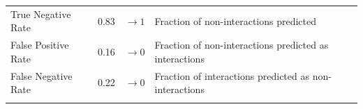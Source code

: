 \documentclass[10pt,oneside]{article}
\begin{document}
\begin{longtable}[]{@{}llll@{}}
\begin{minipage}[t]{0.21\columnwidth}\raggedright
True Negative Rate\strut
\end{minipage} & \begin{minipage}[t]{0.05\columnwidth}\raggedright
0.83\strut
\end{minipage} & \begin{minipage}[t]{0.13\columnwidth}\raggedright
\(\rightarrow 1\)\strut
\end{minipage} & \begin{minipage}[t]{0.49\columnwidth}\raggedright
Fraction of non-interactions predicted\strut
\end{minipage}\tabularnewline
\begin{minipage}[t]{0.21\columnwidth}\raggedright
False Positive Rate\strut
\end{minipage} & \begin{minipage}[t]{0.05\columnwidth}\raggedright
0.16\strut
\end{minipage} & \begin{minipage}[t]{0.13\columnwidth}\raggedright
\(\rightarrow 0\)\strut
\end{minipage} & \begin{minipage}[t]{0.49\columnwidth}\raggedright
Fraction of non-interactions predicted as interactions\strut
\end{minipage}\tabularnewline
\begin{minipage}[t]{0.21\columnwidth}\raggedright
False Negative Rate\strut
\end{minipage} & \begin{minipage}[t]{0.05\columnwidth}\raggedright
0.22\strut
\end{minipage} & \begin{minipage}[t]{0.13\columnwidth}\raggedright
\(\rightarrow 0\)\strut
\end{minipage} & \begin{minipage}[t]{0.49\columnwidth}\raggedright
Fraction of interactions predicted as non-interactions\strut
\end{minipage}\tabularnewline
\begin{minipage}[t]{0.21\columnwidth}\raggedright
\strut
\end{minipage} & \begin{minipage}[t]{0.05\columnwidth}\raggedright
\strut
\end{minipage} & \begin{minipage}[t]{0.13\columnwidth}\raggedright
\strut
\end{minipage} & \begin{minipage}[t]{0.49\columnwidth}\raggedright

\end{minipage}
\end{longtable}
\end{document}
